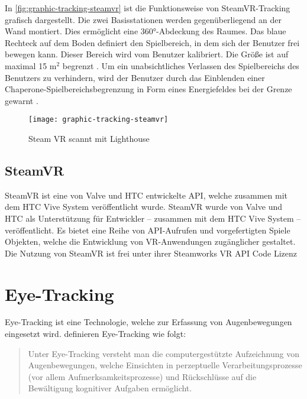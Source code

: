 In \autoref{fig:graphic-tracking-steamvr} ist die Funktionsweise von SteamVR-Tracking grafisch dargestellt. Die zwei Basisstationen werden gegenüberliegend an der Wand montiert. Dies ermöglicht eine 360°-Abdeckung des Raumes. Das blaue Rechteck auf dem Boden definiert den Spielbereich, in dem sich der Benutzer frei bewegen kann. Dieser Bereich wird vom Benutzer kalibriert. Die Größe ist auf maximal 15 m$^2$ begrenzt \cite{ViveProduct}. Um ein unabsichtliches Verlassen des Spielbereichs des Benutzers zu verhindern, wird der Benutzer durch das Einblenden einer Chaperone-Spielbereichsbegrenzung in Form eines Energiefeldes bei der Grenze gewarnt \cite{ViveProduct}. 

\begin{figure}[!htbp]
	\centering
	\texttt{[image: graphic-tracking-steamvr]}
	\caption[Steam VR scannt mit Lighthouse]{Steam VR scannt mit Lighthouse \cite{Sauter.2015}}
	\label{fig:graphic-tracking-steamvr}
\end{figure}

\subsection{SteamVR}
SteamVR ist eine von Valve und HTC entwickelte API, welche zusammen mit dem HTC Vive System veröffentlicht wurde. 
{\color{red} SteamVR wurde von Valve und HTC als Unterstützung für Entwickler – zusammen mit dem HTC Vive System – veröffentlicht. Es bietet eine Reihe von API-Aufrufen und vorgefertigten Spiele Objekten, welche die Entwicklung von VR-Anwendungen zugänglicher gestaltet. Die Nutzung von SteamVR ist frei unter ihrer Steamworks VR API Code Lizenz}

\section{Eye-Tracking}
Eye-Tracking ist eine Technologie, welche zur Erfassung von Augenbewegungen eingesetzt wird. \citeauthor{BartlPokorny.2013} definieren Eye-Tracking wie folgt: 

\begin{quote}
	\glqq Unter Eye-Tracking versteht man die computergestützte Aufzeichnung von Augenbewegungen, welche Einsichten in perzeptuelle Verarbeitungsprozesse (vor allem Aufmerksamkeitsprozesse) und Rückschlüsse auf die Bewältigung kognitiver Aufgaben ermöglicht.\grqq \cite{BartlPokorny.2013} 
\end{quote}

